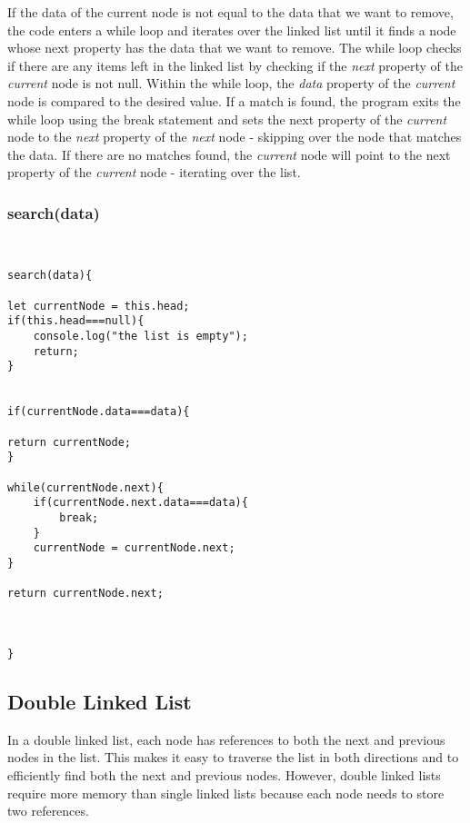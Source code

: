 \documentclass{article}
\begin{document}
If the data of the current node is not equal to the data that we want to remove, the code enters a while loop and iterates over the linked list until it finds a node whose next property has the data that we want to remove.
The while loop checks if there are any items left in the linked list by checking if the \textit{next} property of the \textit{current} node is not null. Within the while loop, the \textit{data} property of the \textit{current} node is compared to the desired value. If a match is found, the program exits the while loop using the break statement and sets the next property of the \textit{current} node to the \textit{next} property of the \textit{next} node - skipping over the node that matches the data. If there are no matches found, the \textit{current} node will point to the next property of the \textit{current} node - iterating over the list.


\newpage

\subsubsection{search(data)}


\begin{verbatim}
    

search(data){

let currentNode = this.head;
if(this.head===null){
    console.log("the list is empty");
    return;
}


if(currentNode.data===data){

return currentNode;
}

while(currentNode.next){
    if(currentNode.next.data===data){
        break;
    }
    currentNode = currentNode.next;
}

return currentNode.next;



}

\end{verbatim}


\subsection[short]{Double Linked List}


In a double linked list, each node has references to both the next and previous nodes in the list. This makes it easy to traverse the list in both directions and to efficiently find both the next and previous nodes. However, double linked lists require more memory than single linked lists because each node needs to store two references.
\end{document}
